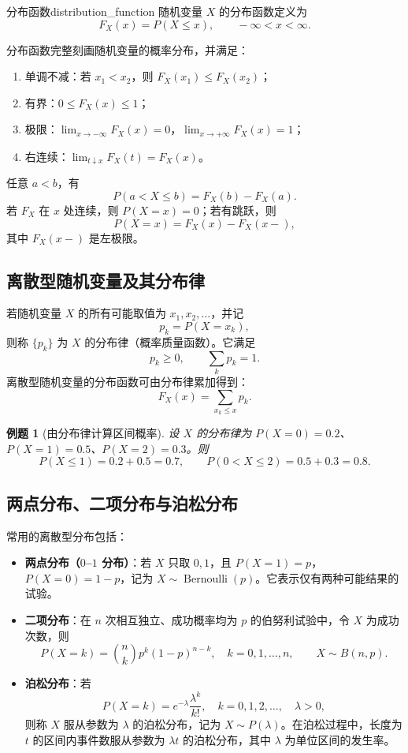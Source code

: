 \documentclass[11pt,a4paper,fontset=fandol]{ctexart}
\newtheorem{example}{例题}[section]
\theoremstyle{remark}
\begin{document}
\begin{definition}{分布函数}{distribution_function}
随机变量 $X$ 的分布函数定义为
\[
    F_X(x)=P(X\leq x),\qquad -\infty<x<\infty.
\]
\end{definition}

分布函数完整刻画随机变量的概率分布，并满足：
\begin{enumerate}
    \item 单调不减：若 $x_1<x_2$，则 $F_X(x_1)\leq F_X(x_2)$；
    \item 有界：$0\leq F_X(x)\leq 1$；
    \item 极限：$\lim_{x\to-\infty}F_X(x)=0$，$\lim_{x\to+\infty}F_X(x)=1$；
    \item 右连续：$\lim_{t\downarrow x}F_X(t)=F_X(x)$。
\end{enumerate}
任意 $a<b$，有
\[
    P(a<X\leq b)=F_X(b)-F_X(a).
\]
若 $F_X$ 在 $x$ 处连续，则 $P(X=x)=0$；若有跳跃，则
\[
    P(X=x)=F_X(x)-F_X(x-),
\]
其中 $F_X(x-)$ 是左极限。

\subsection{离散型随机变量及其分布律}
若随机变量 $X$ 的所有可能取值为 $x_1,x_2,\ldots$，并记
\[
    p_k=P(X=x_k),
\]
则称 $\{p_k\}$ 为 $X$ 的分布律（概率质量函数）。它满足
\[
    p_k\geq 0,\qquad \sum_k p_k=1.
\]
离散型随机变量的分布函数可由分布律累加得到：
\[
    F_X(x)=\sum_{x_k\leq x}p_k.
\]

\begin{example}[由分布律计算区间概率]
设 $X$ 的分布律为 $P(X=0)=0.2$、$P(X=1)=0.5$、$P(X=2)=0.3$。则
\[
    P(X\leq 1)=0.2+0.5=0.7,\qquad
    P(0<X\leq 2)=0.5+0.3=0.8.
\]
\end{example}

\subsection{两点分布、二项分布与泊松分布}
常用的离散型分布包括：
\begin{itemize}
    \item \textbf{两点分布（$0$--$1$ 分布）}：若 $X$ 只取 $0,1$，且 $P(X=1)=p$，$P(X=0)=1-p$，记为 $X\sim\operatorname{Bernoulli}(p)$。它表示仅有两种可能结果的试验。
    \item \textbf{二项分布}：在 $n$ 次相互独立、成功概率均为 $p$ 的伯努利试验中，令 $X$ 为成功次数，则
    \[
        P(X=k)=\binom{n}{k}p^k(1-p)^{n-k},
        \quad k=0,1,\ldots,n,
        \qquad X\sim B(n,p).
    \]
    \item \textbf{泊松分布}：若
    \[
        P(X=k)=e^{-\lambda}\frac{\lambda^k}{k!},
        \quad k=0,1,2,\ldots,\quad \lambda>0,
    \]
    则称 $X$ 服从参数为 $\lambda$ 的泊松分布，记为 $X\sim P(\lambda)$。在泊松过程中，长度为 $t$ 的区间内事件数服从参数为 $\lambda t$ 的泊松分布，其中 $\lambda$ 为单位区间的发生率。
\end{itemize}
\end{document}
